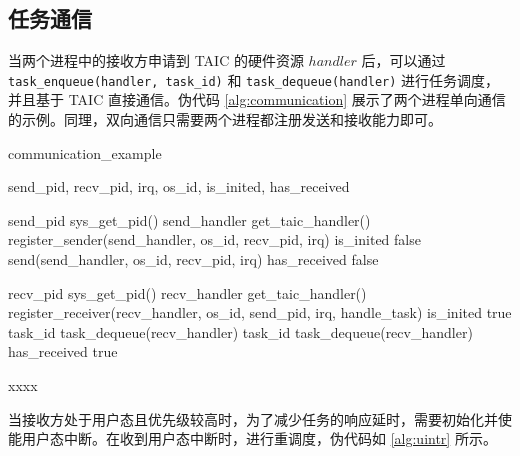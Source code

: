 \subsection{任务通信}

当两个进程中的接收方申请到 TAIC 的硬件资源 $handler$ 后，可以通过 \verb|task_enqueue(handler, task_id)| 和 \verb|task_dequeue(handler)| 进行任务调度，并且基于 TAIC 直接通信。伪代码 \ref{alg:communication} 展示了两个进程单向通信的示例。同理，双向通信只需要两个进程都注册发送和接收能力即可。

\begin{algorithm}
  \caption{communication\_example}
  \label{alg:communication}
  \begin{algorithmic}[1]
    \State send\_pid, recv\_pid, irq, os\_id, is\_inited, has\_received

          
      \State send\_pid \gets sys\_get\_pid()
      \State send\_handler \gets get\_taic\_handler() 
      \State register\_sender(send\_handler, os\_id, recv\_pid, irq) 
      \Loop
        \EndWhile
        \State is\_inited \gets false
        \State send(send\_handler, os\_id, recv\_pid, irq) 
        \EndWhile
        \State has\_received \gets false
      \EndLoop
    \EndProcedure

          
      \State recv\_pid \gets sys\_get\_pid()
      \State recv\_handler \gets get\_taic\_handler() 
      \Loop
        \State register\_receiver(recv\_handler, os\_id, send\_pid, irq, handle\_task) 
        \State is\_inited \gets true
        \State task\_id \gets task\_dequeue(recv\_handler)
         
          \State task\_id \gets task\_dequeue(recv\_handler)
        \EndWhile
        \State has\_received \gets true
      \EndLoop
    \EndProcedure

          
      \State xxxx
    \EndProcedure
  \end{algorithmic}
\end{algorithm}

当接收方处于用户态且优先级较高时，为了减少任务的响应延时，需要初始化并使能用户态中断。在收到用户态中断时，进行重调度，伪代码如 \ref{alg:uintr} 所示。

